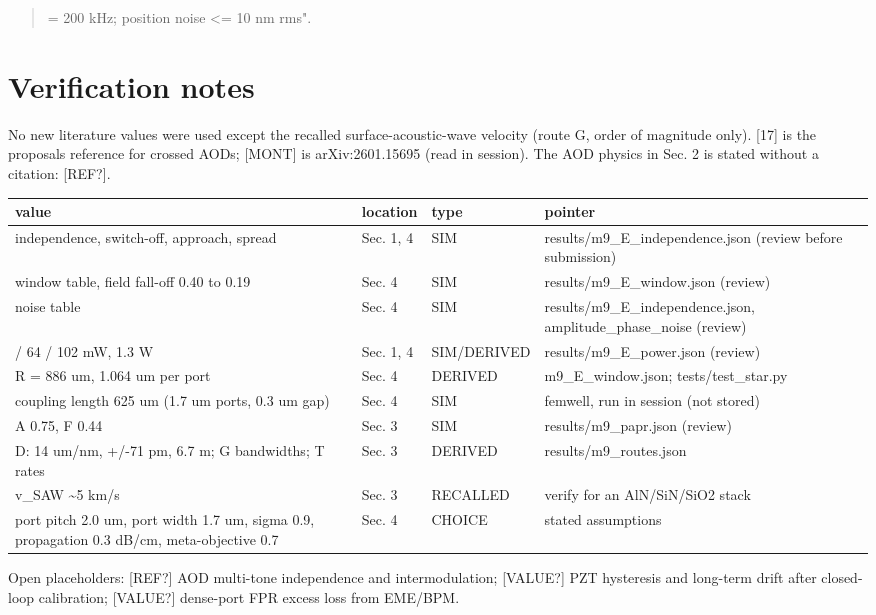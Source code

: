 \begin{quote}
= 200 kHz; position noise \textless= 10 nm rms".
\end{quote}

\hypertarget{verification-notes}{%
\section{Verification notes}\label{independent_steering-verification-notes}}

No new literature values were used except the recalled
surface-acoustic-wave velocity (route G, order of magnitude only).
{[}17{]} is the proposal\textquotesingle s reference for crossed AODs;
{[}MONT{]} is arXiv:2601.15695 (read in session). The AOD physics in
Sec. 2 is stated without a citation: {[}REF?{]}.

{\footnotesize
\begin{longtable}[]{@{}>{\raggedright\arraybackslash}p{0.294\dimexpr(\linewidth-8\tabcolsep)\relax}>{\raggedright\arraybackslash}p{0.108\dimexpr(\linewidth-8\tabcolsep)\relax}>{\raggedright\arraybackslash}p{0.147\dimexpr(\linewidth-8\tabcolsep)\relax}>{\raggedright\arraybackslash}p{0.451\dimexpr(\linewidth-8\tabcolsep)\relax}@{}}
\toprule\noalign{}
value & location & type & pointer \\
\midrule\noalign{}
\endhead
\bottomrule\noalign{}
\endlastfoot
independence, switch-off, approach, spread & Sec. 1, 4 & SIM &
results/m9\_E\_independence.json (review before submission) \\
window table, field fall-off 0.40 to 0.19 & Sec. 4 & SIM &
results/m9\_E\_window.json (review) \\
noise table & Sec. 4 & SIM & results/m9\_E\_independence.json,
amplitude\_phase\_noise (review) \\
48 / 64 / 102 mW, 1.3 W & Sec. 1, 4 & SIM/DERIVED &
results/m9\_E\_power.json (review) \\
R = 886 um, 1.064 um per port & Sec. 4 & DERIVED & m9\_E\_window.json;
tests/test\_star.py \\
coupling length 625 um (1.7 um ports, 0.3 um gap) & Sec. 4 & SIM &
femwell, run in session (not stored) \\
A\textquotesingle{} 0.75, F 0.44 & Sec. 3 & SIM & results/m9\_papr.json
(review) \\
D: 14 um/nm, +/-71 pm, 6.7 m; G bandwidths; T rates & Sec. 3 & DERIVED &
results/m9\_routes.json \\
v\_SAW \textasciitilde5 km/s & Sec. 3 & RECALLED & verify for an
AlN/SiN/SiO2 stack \\
port pitch 2.0 um, port width 1.7 um, sigma 0.9, propagation 0.3 dB/cm,
meta-objective 0.7 & Sec. 4 & CHOICE & stated assumptions \\
\end{longtable}
}

Open placeholders: {[}REF?{]} AOD multi-tone independence and
intermodulation; {[}VALUE?{]} PZT hysteresis and long-term drift after
closed-loop calibration; {[}VALUE?{]} dense-port FPR excess loss from
EME/BPM.
